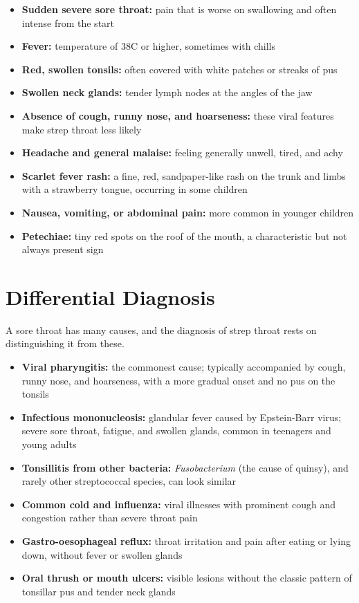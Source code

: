 \begin{itemize}
    \item \textbf{Sudden severe sore throat:} pain that is worse on swallowing and often intense from the start
    \item \textbf{Fever:} temperature of 38\textdegree{}C or higher, sometimes with chills
    \item \textbf{Red, swollen tonsils:} often covered with white patches or streaks of pus
    \item \textbf{Swollen neck glands:} tender lymph nodes at the angles of the jaw
    \item \textbf{Absence of cough, runny nose, and hoarseness:} these viral features make strep throat less likely
    \item \textbf{Headache and general malaise:} feeling generally unwell, tired, and achy
    \item \textbf{Scarlet fever rash:} a fine, red, sandpaper-like rash on the trunk and limbs with a strawberry tongue, occurring in some children
    \item \textbf{Nausea, vomiting, or abdominal pain:} more common in younger children
    \item \textbf{Petechiae:} tiny red spots on the roof of the mouth, a characteristic but not always present sign
\end{itemize}

\section*{Differential Diagnosis}
A sore throat has many causes, and the diagnosis of strep throat rests on distinguishing it from these.

\begin{itemize}
    \item \textbf{Viral pharyngitis:} the commonest cause; typically accompanied by cough, runny nose, and hoarseness, with a more gradual onset and no pus on the tonsils
    \item \textbf{Infectious mononucleosis:} glandular fever caused by Epstein-Barr virus; severe sore throat, fatigue, and swollen glands, common in teenagers and young adults
    \item \textbf{Tonsillitis from other bacteria:} \textit{Fusobacterium} (the cause of quinsy), and rarely other streptococcal species, can look similar
    \item \textbf{Common cold and influenza:} viral illnesses with prominent cough and congestion rather than severe throat pain
    \item \textbf{Gastro-oesophageal reflux:} throat irritation and pain after eating or lying down, without fever or swollen glands
    \item \textbf{Oral thrush or mouth ulcers:} visible lesions without the classic pattern of tonsillar pus and tender neck glands
\end{itemize}

